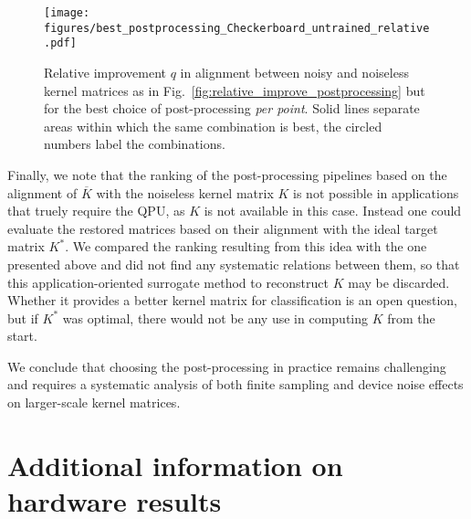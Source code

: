 \documentclass[twocolumn,superscriptaddress,nofootinbib]{revtex4-2}
\begin{document}
\begin{figure*}
    \centering
    \texttt{[image: figures/best\_postprocessing\_Checkerboard\_untrained\_relative.pdf]}
    \caption{Relative improvement $q$ in alignment between noisy and noiseless kernel matrices as in Fig.~\ref{fig:relative_improve_postprocessing} but for the best choice of post-processing \emph{per point}.
    Solid lines separate areas within which the same combination is best, the circled numbers label the combinations.
    }
    \label{fig:best_postprocessing}
\end{figure*}

Finally, we note that the ranking of the post-processing pipelines based on the alignment of $\overline{K}$ with the noiseless kernel matrix $K$ is not possible in applications that truely require the QPU, as $K$ is not available in this case.
Instead one could evaluate the restored matrices based on their alignment with the ideal target matrix $K^\ast$.
We compared the ranking resulting from this idea with the one presented above and did not find any systematic relations between them, so that this application-oriented surrogate method to reconstruct $K$ may be discarded.
Whether it provides a better kernel matrix for classification is an open question, but if $K^\ast$ was optimal, there would not be any use in computing $K$ from the start.

We conclude that choosing the post-processing in practice remains challenging and requires a systematic analysis of both finite sampling and device noise effects on larger-scale kernel matrices. 


\section{Additional information on hardware results}
\end{document}
